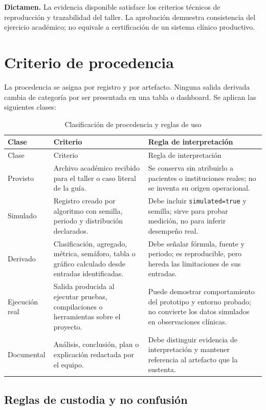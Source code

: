 \textbf{Dictamen.} La evidencia disponible satisface los criterios técnicos de reproducción y trazabilidad del taller. La aprobación demuestra consistencia del ejercicio académico; no equivale a certificación de un sistema clínico productivo.

\section{Criterio de procedencia}

La procedencia se asigna por registro y por artefacto. Ninguna salida derivada cambia de categoría por ser presentada en una tabla o dashboard. Se aplican las siguientes clases:

\begin{longtable}{p{2.7cm}p{4.8cm}p{5.1cm}}
\caption{Clasificación de procedencia y reglas de uso}\label{tab:provenance}\\
\toprule
Clase & Criterio & Regla de interpretación \\
\midrule
\endfirsthead
\toprule
Clase & Criterio & Regla de interpretación \\
\midrule
\endhead
Provisto & Archivo académico recibido para el taller o caso literal de la guía. & Se conserva sin atribuirlo a pacientes o instituciones reales; no se inventa su origen operacional. \\
Simulado & Registro creado por algoritmo con semilla, periodo y distribución declarados. & Debe incluir \texttt{simulated=true} y semilla; sirve para probar medición, no para inferir desempeño real. \\
Derivado & Clasificación, agregado, métrica, semáforo, tabla o gráfico calculado desde entradas identificadas. & Debe señalar fórmula, fuente y periodo; es reproducible, pero hereda las limitaciones de sus entradas. \\
Ejecución real & Salida producida al ejecutar pruebas, compilaciones o herramientas sobre el proyecto. & Puede demostrar comportamiento del prototipo y entorno probado; no convierte los datos simulados en observaciones clínicas. \\
Documental & Análisis, conclusión, plan o explicación redactada por el equipo. & Debe distinguir evidencia de interpretación y mantener referencia al artefacto que la sustenta. \\
\bottomrule
\end{longtable}

\subsection*{Reglas de custodia y no confusión}

